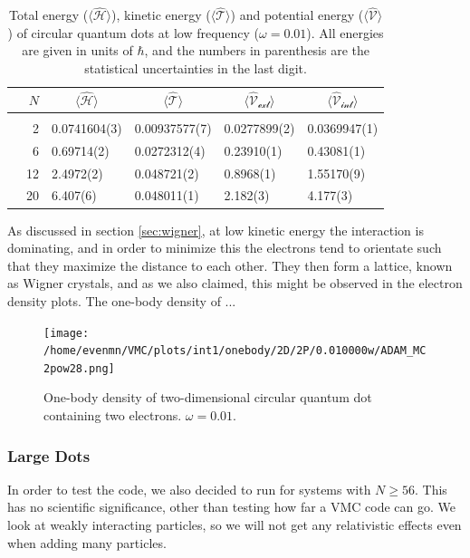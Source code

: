 \begin{table}
	\caption{Total energy ($\langle \hat{\mathcal{H}}\rangle$), kinetic energy ($\langle \hat{\mathcal{T}}\rangle$) and potential energy ($\langle \hat{\mathcal{V}}\rangle$) of circular quantum dots at low frequency ($\omega=0.01$). All energies are given in units of $\hbar$, and the numbers in parenthesis are the statistical uncertainties in the last digit.}
	\label{tab:lowfrequencyQD}
	\begin{tabularx}{\textwidth}{R{2cm}rR{2.3cm}R{2.3cm}R{2.3cm}R{2.3cm}} \hline\hline
		& &  &  &  &  \\ \hline \\
		&2 & 0.0741604(3) & 0.00937577(7) & 0.0277899(2) & 0.0369947(1) \\
		&6 & 0.69714(2) & 0.0272312(4) & 0.23910(1) & 0.43081(1) \\
		&12 & 2.4972(2) & 0.048721(2) & 0.8968(1) & 1.55170(9)\\
		&20 & 6.407(6) & 0.048011(1) & 2.182(3) & 4.177(3) \\ \hline \hline
	\end{tabularx}
\end{table} 

As discussed in section \ref{sec:wigner}, at low kinetic energy the interaction is dominating, and in order to minimize this the electrons tend to orientate such that they maximize the distance to each other. They then form a lattice, known as Wigner crystals, and as we also claimed, this might be observed in the electron density plots. The one-body density of ...

\begin{figure}
	\centering
	\texttt{[image: /home/evenmn/VMC/plots/int1/onebody/2D/2P/0.010000w/ADAM\_MC2pow28.png]}
	\caption{One-body density of two-dimensional circular quantum dot containing two electrons. $\omega=0.01$.}
\end{figure}

\subsubsection{Large Dots}
In order to test the code, we also decided to run for systems with $N\geq 56$. This has no scientific significance, other than testing how far a VMC code can go. We look at weakly interacting particles, so we will not get any relativistic effects even when adding many particles.

